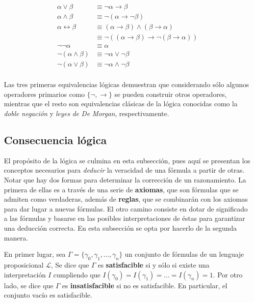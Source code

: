 \begin{align*}
    \alpha \lor \beta &\equiv \neg\alpha \rightarrow \beta \\
    \alpha \land \beta &\equiv \neg(\alpha \rightarrow \neg \beta ) \\
    \alpha \leftrightarrow \beta &\equiv (\alpha \rightarrow \beta) \land (\beta \rightarrow \alpha) \\
    &\equiv \neg((\alpha \rightarrow \beta) \rightarrow \neg(\beta \rightarrow \alpha)) \\
    \neg \neg \alpha &\equiv \alpha \\
    \neg(\alpha \land \beta) &\equiv \neg \alpha \lor \neg\beta \\
    \neg(\alpha \lor \beta) &\equiv \neg\alpha \land \neg\beta \\
\end{align*}

Las tres primeras equivalencias lógicas demuestran que considerando sólo algunos operadores primarios como $\lbrace \neg, \rightarrow \rbrace$ se pueden construir otros operadores, mientras que el resto son equivalencias clásicas de la lógica conocidas como la \textit{doble negación} y \textit{leyes de De Morgan}, respectivamente.

\subsection{Consecuencia lógica}\label{subsection:lpropconsec}
El propósito de la lógica se culmina en esta subsección, pues aquí se presentan los conceptos necesarios para \textit{deducir} la veracidad de una fórmula a partir de otras. Notar que hay dos formas para determinar la corrección de un razonamiento. La primera de ellas es a través de una serie de \textbf{axiomas}, que son fórmulas que se admiten como verdaderas, además de \textbf{reglas}, que se combinarán con los axiomas para dar lugar a nuevas fórmulas. El otro camino consiste en dotar de significado a las fórmulas y basarse en las posibles interpretaciones de éstas para garantizar una deducción correcta. En esta subsección se opta por hacerlo de la segunda manera.

En primer lugar, sea $\Gamma = \lbrace \gamma_0, \gamma_1, \ldots, \gamma_n \rbrace$ un conjunto de fórmulas de un lenguaje proposicional $\mathcal{L}$, Se dice que $\Gamma$ es \textbf{satisfacible} si y sólo si existe una interpretación $I$ cumpliendo que $I(\gamma_0) = I(\gamma_1) = \ldots = I(\gamma_n) = 1$. Por otro lado, se dice que $\Gamma$ es \textbf{insatisfacible} si no es satisfacible. En particular, el conjunto vacío es satisfacible.

